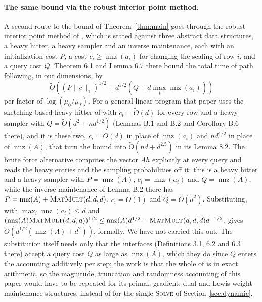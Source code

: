 \documentclass[11pt]{article}
\newcommand{\nnz}{\operatorname{nnz}}
\newcommand{\MM}{\textsc{MatMult}}
\renewcommand{\O}{\widetilde O}
\begin{document}
\paragraph{The same bound via the robust interior point method.}
A second route to the bound of Theorem~\ref{thm:main} goes through the robust
interior point method of \cite{BLLSSSW21},
which is stated against three abstract data structures, a heavy hitter, a heavy
sampler and an inverse maintenance, each with an initialization cost $P$, a cost
$c_i \ge \nnz(a_i)$ for changing the scaling of row
$i$, and a query cost
$Q$.
Theorem 6.1 and Lemma 6.7 there bound the total time of path following, in our
dimensions, by
\[
\O\left( (P \|c\|_1)^{1/2}
  + d^{1/2} \left( Q + d \max_i \nnz(a_i) \right) \right)
\]
per factor of $\log(\mu_0 / \mu_f)$.
For a general linear program that paper uses the sketching based heavy hitter of
\cite{BLSS20} with $c_i = \O(d)$ for every row and a heavy
sampler with $Q = \O(d^{2} + n d^{1/2})$ (Lemmas B.1 and B.2 and Corollary B.6
there), and it is these two, $c_i = \O(d)$ in place of
$\nnz(a_i)$ and
$n d^{1/2}$ in place of
$\nnz(A)$, that turn the bound into
$\O(nd + d^{2.5})$ in its Lemma 8.2.
The brute force alternative computes the vector $A h$ explicitly at every query
and reads the heavy entries and the sampling probabilities off it: this is a
heavy hitter and a heavy sampler with $P = \nnz(A)$,
$c_i = \nnz(a_i)$ and
$Q = \nnz(A)$, while the inverse maintenance of Lemma B.2 there has
$P = \nnz(A) + \MM(d, d, d)$,
$c_i = O(1)$ and
$Q = \O(d^{2})$.
Substituting, with $\max_i \nnz(a_i) \le d$ and
$(\nnz(A) \MM(d, d, d))^{1/2} \le \nnz(A) d^{1/2} + \MM(d, d, d) d^{-1/2}$,
gives $\O(d^{1/2}(\nnz(A) + d^{2}))$, formally.
We have not carried this out.
The substitution itself needs only that the interfaces (Definitions 3.1, 6.2 and
6.3 there) accept a query cost $Q$ as large as
$\nnz(A)$, which they do since
$Q$ enters the accounting additively per step; the work is that the whole of
\cite{BLLSSSW21} is in exact arithmetic, so
the magnitude, truncation and randomness accounting of this paper would have to
be repeated for its primal, gradient, dual and Lewis weight maintenance
structures, instead of for the single \textsc{Solve} of
Section~\ref{sec:dynamic}.
\end{document}
